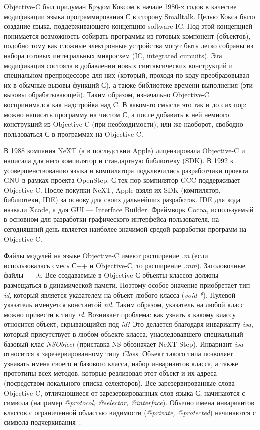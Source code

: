 Objective-C был придуман Брэдом Коксом в начале 1980-x годов
в качестве модификации языка программирования С в сторону Smalltalk.
Целью Кокса было создание языка, поддерживающего концепцию software IC.
Под этой концепцией понимается возможность собирать программы из готовых
компонент (объектов), подобно тому как сложные электронные устройства могут быть
легко собраны из набора готовых интегральных микросхем (IC, integrated curcuits).
Эта модификация состояла в добавлении новых синтаксических
конструкций и специальном препроцессоре для них (который, проходя по коду
преобразовывал их в обычные вызовы функций С),
а также библиотеке времени выполнения (эти вызовы обрабатывающей).
Таким образом, изначально Objective-C воспринимался как надстройка над C.
В каком-то смысле это так и до сих пор: можно написать программу на чистом С,
а после добавить к ней немного конструкций из Objective-C (при необходимости),
или же наоборот, свободно пользоваться С в программах на Objective-C.

В 1988 компания NeXT (а в последствии Apple)
лицензировала Objective-C и написала для него компилятор и
стандартную библиотеку (SDK).
В 1992 к усовершенствованию языка и компилятора подключились разработчики
проекта GNU в рамках проекта OpenStep. С тех пор компилятор GCC поддерживает Objective-C.
После покупки NeXT, Apple взяля их SDK (компилятор, библиотеки, IDE) за основу
для своих дальнейших разработок. IDE для кода назвали Xcode,
а для GUI --– Interface Builder.
Фреймворк Cocoa, используемый в основном для разработки графического интерфейса пользователя,
на сегодняшний день является наиболее значимой средой разработки программ на Objective-C.

Файлы модулей на языке Objective-C имеют расширение \textit{.m}
(если использовалась смесь С++ и Objective-С, то расширение \textit{.mm}).
Заголовочные файлы --– \textit{.h}. Все создаваемые в Objective-С объекты классов
должны размещаться в динамической памяти. Поэтому особое значение приобретает
тип \textit{id}, который является указателем на объект любого класса (\textit{void *}).
Нулевой указатель именуется константой \textit{nil}.
Таким образом, указатель на любой класс можно привести к типу \textit{id}.
Возникает проблема: как узнать к какому классу относится объект,
скрывающийся под \textit{id}? Это делается благодаря инварианту \textit{isa},
который присутствует в любом объекте класса, унаследовавшего специальный
базовый клас \textit{NSObject} (приставка NS обозначает NeXT Step).
Инвариант \textit{isa} относится к зарезервированному типу \textit{Class}.
Объект такого типа позволяет узнавать имена своего и базового класса,
набор инвариантов класса, а также прототипы всех методов,
которые реализовал этот объект и их адреса (посредством локального списка селекторов).
Все зарезервированные слова Objective-C, отличающиеся от зарезервированных
слов языка С, начинаются с символа \@ (например \textit{@protocol, @selector, @interface}).
Обычно имена инвариантов классов с ограниченной
областью видимости (\textit{@private, @protected}) начинаются с
символа подчеркивания~\cite{objective_c_from_scratch, appledoc_ios}.


